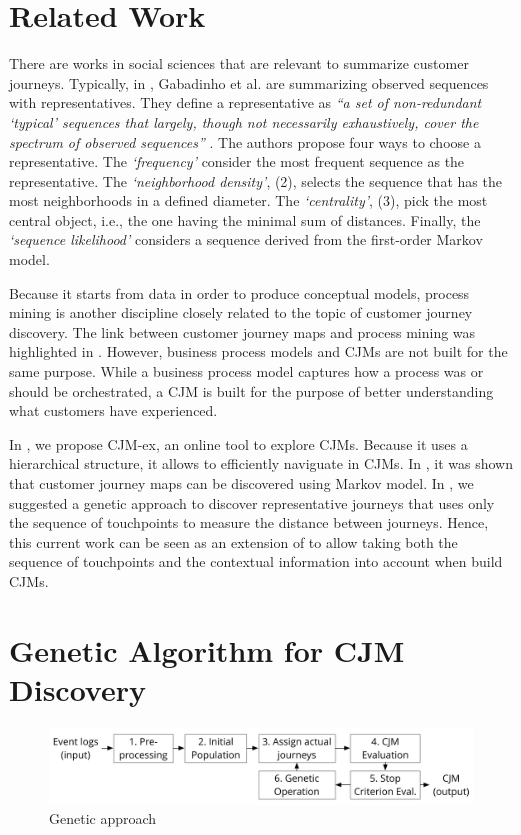 \documentclass[runningheads]{llncs}
\begin{document}
{\section{Related Work}
There are works in social sciences that are relevant to summarize customer journeys. Typically, in \cite{gabadinho2009summarizing,gabadinho2009extracting}, Gabadinho et al. are summarizing observed sequences with representatives. They define a representative as {\it``a set of non-redundant `typical' sequences that largely, though not necessarily exhaustively, cover the spectrum of observed sequences''} \cite{gabadinho2009summarizing}. The authors propose four ways to choose a representative. The {\it `frequency'} consider the most frequent sequence as the representative. The {\it `neighborhood density'}, (2), selects the sequence that has the most neighborhoods in a defined diameter. The {\it `centrality'}, (3), pick the most central object, i.e., the one having the minimal sum of distances. Finally, the {\it `sequence likelihood'} considers a sequence derived from the first-order Markov model. 

Because it starts from data in order to produce conceptual models, process mining is another discipline closely related to the topic of customer journey discovery. The link between customer journey maps and process mining was highlighted in \cite{bernard2017cjm}. However, business process models and CJMs are not built for the same purpose. While a business process model captures how a process was or should be orchestrated, a CJM is built for the purpose of better understanding what customers have experienced. 

In \cite{bernard2017cjmEX}, we propose CJM-ex, an online tool to explore CJMs. Because it uses a hierarchical structure, it allows to efficiently naviguate in CJMs. In \cite{bernard2017Markov}, it was shown that customer journey maps can be discovered using Markov model. In \cite{bernard2019genetic}, we suggested a genetic approach to discover representative journeys that uses only the sequence of touchpoints to measure the distance between journeys. Hence, this current work can be seen as an extension of \cite{bernard2019genetic} to allow taking both the sequence of touchpoints and the contextual information into account when build CJMs. 


\section{Genetic Algorithm for CJM Discovery}
\begin{figure}[H]
\centering
\includegraphics[width=0.8\columnwidth]{05_schema/process.pdf}
  \caption{Genetic approach}
  \label{fig:process}
\end{figure}

}
\end{document}
